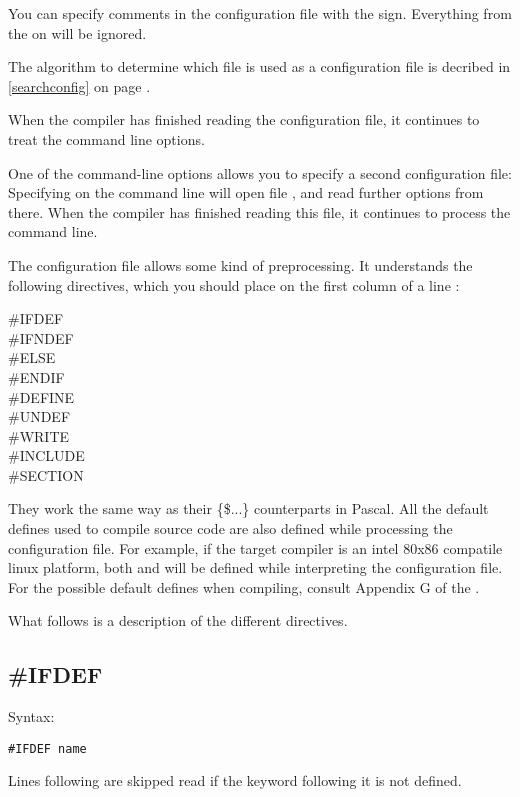 You can specify comments in the configuration file with the \var{\#} sign.
Everything from the \var{\#} on will be ignored.

The algorithm to determine which file is used as a configuration file
is decribed in \ref{searchconfig} on page \pageref{searchconfig}.

When the compiler has finished reading the configuration file, it continues
to treat the command line options.

One of the command-line options allows you to specify a second configuration
file: Specifying  on the command line will open file ,
and read further options from there. When the compiler has finished reading
this file, it continues to process the command line.

The configuration file allows some kind of preprocessing. It understands the
following directives, which you should place on the first column of a line :
\begin{description}
\item [\#IFDEF]
\item [\#IFNDEF]
\item [\#ELSE]
\item [\#ENDIF]
\item [\#DEFINE]
\item [\#UNDEF]
\item [\#WRITE]
\item [\#INCLUDE]
\item [\#SECTION]
\end{description}
They work the same way as their \{\$...\}  counterparts in Pascal. All the default
defines used to compile source code are also defined while processing the configuration
file. For example, if the target compiler is an intel 80x86 compatile linux platform,
both  and  will be defined while interpreting the configuration
file. For the possible default defines when compiling, consult Appendix G of the \progref.


What follows is a description of the different directives.

\subsection{\#IFDEF}
Syntax:
\begin{verbatim}
#IFDEF name
\end{verbatim}
Lines following  are skipped read if the keyword 
following it is not defined.

